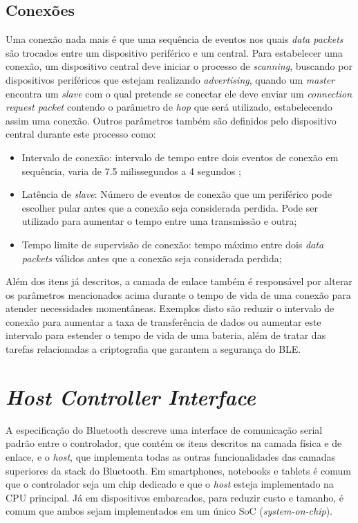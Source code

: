 \documentclass[a5paper]{ufsc-thesis}  %
\begin{document}
\subsection{Conexões}
Uma conexão nada mais é que uma sequência de eventos nos quais \textit{data packets} são trocados entre um dispositivo periférico e um central. Para estabelecer uma conexão, um dispositivo central deve iniciar o processo de \textit{scanning}, buscando por dispositivos periféricos que estejam realizando \textit{advertising}, quando um \textit{master} encontra um \textit{slave} com o qual pretende se conectar ele deve enviar um \textit{connection request packet} contendo o parâmetro de \textit{hop} que será utilizado, estabelecendo assim uma conexão. Outros parâmetros também são definidos pelo dispositivo central durante este processo como:
\begin{itemize}
    \item Intervalo de conexão: intervalo de tempo entre dois eventos de conexão em sequência, varia de 7.5 milissegundos a 4 segundos \cite{bt_core};
    \item Latência de \textit{slave}: Número de eventos de conexão que um periférico pode escolher pular antes que a conexão seja considerada perdida. Pode ser utilizado para aumentar o tempo entre uma transmissão e outra;
    \item Tempo limite de supervisão de conexão: tempo máximo entre dois \textit{data packets} válidos antes que a conexão seja considerada perdida;
\end{itemize}

Além dos itens já descritos, a camada de enlace também é responsável por alterar os parâmetros mencionados acima durante o tempo de vida de uma conexão para atender necessidades momentâneas. Exemplos disto são reduzir o intervalo de conexão para aumentar a taxa de transferência de dados ou aumentar este intervalo para estender o tempo de vida de uma bateria,  além de tratar das tarefas relacionadas a criptografia que garantem a segurança do BLE.

\section{\textit{Host Controller Interface}}
A especificação do Bluetooth \cite{bt_core} descreve uma interface de comunicação serial padrão entre o controlador, que contém os itens descritos na camada física e de enlace, e o \textit{host}, que implementa todas as outras funcionalidades das camadas superiores da stack do Bluetooth. Em smartphones, notebooks e tablets é comum que o controlador seja um chip dedicado e que o \textit{host} esteja implementado na CPU principal. Já em dispositivos embarcados, para reduzir custo e tamanho, é comum que ambos sejam implementados em um único SoC (\textit{system-on-chip}).
\end{document}
